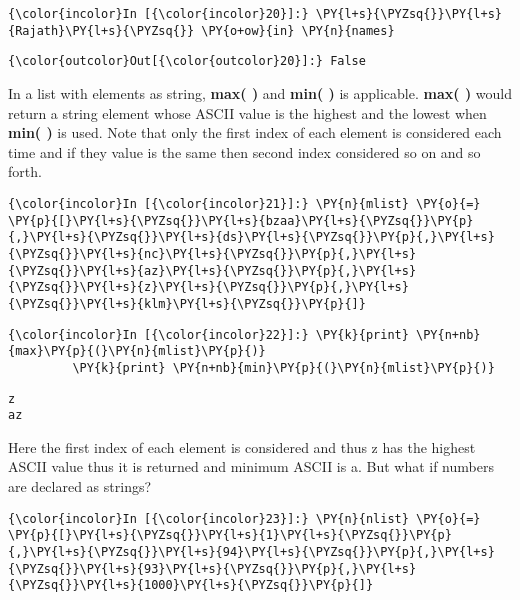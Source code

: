     \begin{Verbatim}[commandchars=\\\{\}]
{\color{incolor}In [{\color{incolor}20}]:} \PY{l+s}{\PYZsq{}}\PY{l+s}{Rajath}\PY{l+s}{\PYZsq{}} \PY{o+ow}{in} \PY{n}{names}
\end{Verbatim}

            \begin{Verbatim}[commandchars=\\\{\}]
{\color{outcolor}Out[{\color{outcolor}20}]:} False
\end{Verbatim}
        
    In a list with elements as string, \textbf{max( )} and \textbf{min( )}
is applicable. \textbf{max( )} would return a string element whose ASCII
value is the highest and the lowest when \textbf{min( )} is used. Note
that only the first index of each element is considered each time and if
they value is the same then second index considered so on and so forth.

    \begin{Verbatim}[commandchars=\\\{\}]
{\color{incolor}In [{\color{incolor}21}]:} \PY{n}{mlist} \PY{o}{=} \PY{p}{[}\PY{l+s}{\PYZsq{}}\PY{l+s}{bzaa}\PY{l+s}{\PYZsq{}}\PY{p}{,}\PY{l+s}{\PYZsq{}}\PY{l+s}{ds}\PY{l+s}{\PYZsq{}}\PY{p}{,}\PY{l+s}{\PYZsq{}}\PY{l+s}{nc}\PY{l+s}{\PYZsq{}}\PY{p}{,}\PY{l+s}{\PYZsq{}}\PY{l+s}{az}\PY{l+s}{\PYZsq{}}\PY{p}{,}\PY{l+s}{\PYZsq{}}\PY{l+s}{z}\PY{l+s}{\PYZsq{}}\PY{p}{,}\PY{l+s}{\PYZsq{}}\PY{l+s}{klm}\PY{l+s}{\PYZsq{}}\PY{p}{]}
\end{Verbatim}

    \begin{Verbatim}[commandchars=\\\{\}]
{\color{incolor}In [{\color{incolor}22}]:} \PY{k}{print} \PY{n+nb}{max}\PY{p}{(}\PY{n}{mlist}\PY{p}{)}
         \PY{k}{print} \PY{n+nb}{min}\PY{p}{(}\PY{n}{mlist}\PY{p}{)}
\end{Verbatim}

    \begin{Verbatim}[commandchars=\\\{\}]
z
az
    \end{Verbatim}

    Here the first index of each element is considered and thus z has the
highest ASCII value thus it is returned and minimum ASCII is a. But what
if numbers are declared as strings?

    \begin{Verbatim}[commandchars=\\\{\}]
{\color{incolor}In [{\color{incolor}23}]:} \PY{n}{nlist} \PY{o}{=} \PY{p}{[}\PY{l+s}{\PYZsq{}}\PY{l+s}{1}\PY{l+s}{\PYZsq{}}\PY{p}{,}\PY{l+s}{\PYZsq{}}\PY{l+s}{94}\PY{l+s}{\PYZsq{}}\PY{p}{,}\PY{l+s}{\PYZsq{}}\PY{l+s}{93}\PY{l+s}{\PYZsq{}}\PY{p}{,}\PY{l+s}{\PYZsq{}}\PY{l+s}{1000}\PY{l+s}{\PYZsq{}}\PY{p}{]}
\end{Verbatim}

